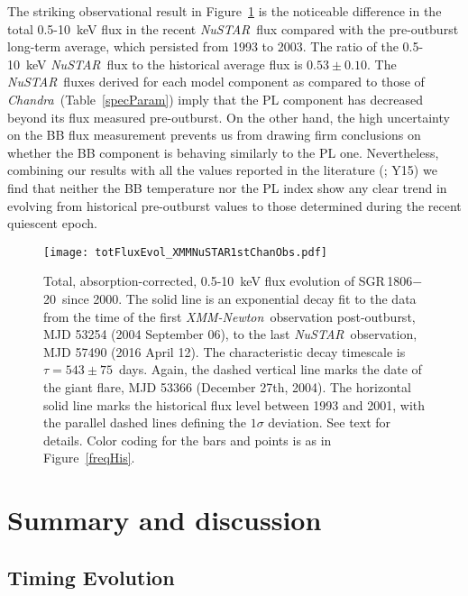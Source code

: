 \documentclass[twocolumn]{aastex6}
\newcommand {\xmm} {\textsl{XMM-Newton}}
\newcommand {\chandra} {\textsl{Chandra}}
\newcommand {\nustar} {\textsl{NuSTAR}}
\def \src {SGR\,1806$-$20}
\begin{document}
The striking observational result in Figure~\ref{fluxEvol} is the
noticeable difference in the total 0.5-10~keV flux in the recent
\nustar\ flux compared with the pre-outburst long-term average, which
persisted from 1993 to 2003. The ratio of the 0.5-10~keV \nustar\ flux
to the historical average flux is $0.53\pm0.10$. The \nustar\ fluxes
derived for each model component as compared to those of \chandra\
(Table~\ref{specParam}) imply that the PL component has decreased
beyond its flux measured pre-outburst. On the other hand, the high
uncertainty on the BB flux measurement prevents us from drawing firm
conclusions on whether the BB component is behaving similarly to the
PL one. Nevertheless, combining our results with all the values
reported in the literature (\citealt{woods07ApJ:1806}; Y15) we find
that neither the BB temperature nor the PL index show any clear trend
in evolving from historical pre-outburst values to those determined
during the recent quiescent epoch.

\begin{figure}[t!]
\begin{center}
\texttt{[image: totFluxEvol\_XMMNuSTAR1stChanObs.pdf]}
\caption{Total, absorption-corrected, 0.5-10~keV flux evolution of
  \src\ since 2000. The solid line is an exponential decay fit to the
  data from the time of the first \xmm\ observation post-outburst, MJD
  53254 (2004 September 06), to the last \nustar\ observation, MJD
  57490 (2016 April 12). The characteristic decay timescale is
  $\tau=543\pm75$~days. Again, the dashed vertical line marks the date
  of the giant flare, MJD 53366 (December 27th, 2004).  The horizontal
  solid line marks the historical flux level between 1993 and 2001,
  with the parallel dashed lines defining the  $1\sigma$
  deviation. See text for details. Color coding for the bars and
  points is as in Figure~\ref{freqHis}.}
\label{fluxEvol}
\end{center}
\end{figure}

\section{Summary and discussion}
\label{discuss}

\subsection{Timing Evolution}
\end{document}
